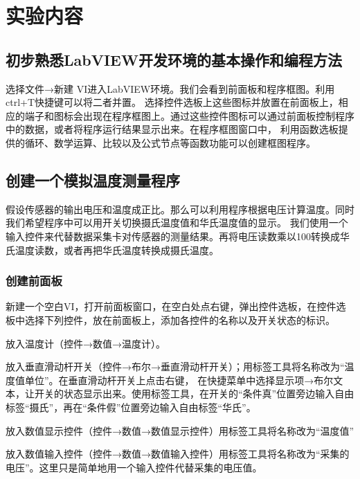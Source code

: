 \documentclass[12pt,a4paper]{article}
\begin{document}
\section{实验内容}
    \subsection{初步熟悉LabVIEW开发环境的基本操作和编程方法}
    选择文件→新建 VI进入LabVIEW环境。我们会看到前面板和程序框图。利用ctrl+T快捷键可以将二者并置。
    选择控件选板上这些图标并放置在前面板上，相应的端子和图标会出现在程序框图上。通过这些控件图标可以通过前面板控制程序中的数据，或者将程序运行结果显示出来。在程序框图窗口中，
    利用函数选板提供的循环、数学运算、比较以及公式节点等函数功能可以创建框图程序。

    \subsection{创建一个模拟温度测量程序}
    假设传感器的输出电压和温度成正比。那么可以利用程序根据电压计算温度。同时我们希望程序中可以用开关切换摄氏温度值和华氏温度值的显示。
    我们使用一个输入控件来代替数据采集卡对传感器的测量结果。再将电压读数乘以100转换成华氏温度读数，或者再把华氏温度转换成摄氏温度。

    \subsubsection{创建前面板}
    新建一个空白VI，打开前面板窗口，在空白处点右键，弹出控件选板，在控件选板中选择下列控件，放在前面板上，添加各控件的名称以及开关状态的标识。\par
    放入温度计（控件→数值→温度计）。\par
    放入垂直滑动杆开关（控件→布尔→垂直滑动杆开关）；用标签工具将名称改为“温度值单位”。在垂直滑动杆开关上点击右键，
    在快捷菜单中选择显示项→布尔文本，让开关的状态显示出来。使用标签工具，在开关的“条件真”位置旁边输入自由标签“摄氏”，再在“条件假”位置旁边输入自由标签“华氏”。\par
    放入数值显示控件（控件→数值→数值显示控件）用标签工具将名称改为“温度值”\par
    放入数值输入控件（控件→数值→数值输入控件）用标签工具将名称改为“采集的电压”。这里只是简单地用一个输入控件代替采集的电压值。\par
\end{document}
